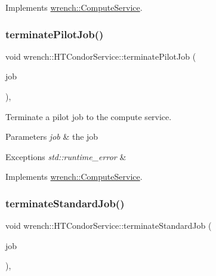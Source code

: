 Implements \hyperlink{classwrench_1_1_compute_service}{wrench\+::\+Compute\+Service}.

\mbox{\label{classwrench_1_1_h_t_condor_service_a5e502916770f5d7e899bf1c106557fbc}} 
\subsubsection{\texorpdfstring{terminate\+Pilot\+Job()}{terminatePilotJob()}}
{\footnotesize\ttfamily void wrench\+::\+H\+T\+Condor\+Service\+::terminate\+Pilot\+Job (\begin{DoxyParamCaption}\item[{\hyperlink{classwrench_1_1_pilot_job}{Pilot\+Job} $\ast$}]{job }\end{DoxyParamCaption})\hspace{0.3cm}{\ttfamily [override]}, {\ttfamily [virtual]}}



Terminate a pilot job to the compute service. 


\begin{DoxyParams}{Parameters}
{\em job} & the job\\
\hline
\end{DoxyParams}

\begin{DoxyExceptions}{Exceptions}
{\em std\+::runtime\+\_\+error} & \\
\hline
\end{DoxyExceptions}


Implements \hyperlink{classwrench_1_1_compute_service}{wrench\+::\+Compute\+Service}.

\mbox{\label{classwrench_1_1_h_t_condor_service_a23ba6cd749a7d90ce153038c606610a3}} 
\subsubsection{\texorpdfstring{terminate\+Standard\+Job()}{terminateStandardJob()}}
{\footnotesize\ttfamily void wrench\+::\+H\+T\+Condor\+Service\+::terminate\+Standard\+Job (\begin{DoxyParamCaption}\item[{\hyperlink{classwrench_1_1_standard_job}{Standard\+Job} $\ast$}]{job }\end{DoxyParamCaption})\hspace{0.3cm}{\ttfamily [override]}, {\ttfamily [virtual]}}



